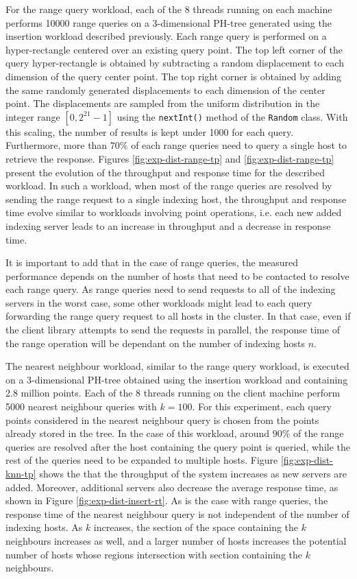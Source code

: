\documentclass[11pt,a4paper]{globis-book}
\begin{document}
For the range query workload, each of the 8 threads running on each machine performs 10000 range queries on a 3-dimensional PH-tree generated using the insertion workload described previously. Each range query is performed on a hyper-rectangle centered over an existing query point. The top left corner of the query hyper-rectangle is obtained by subtracting a random displacement to each dimension of the query center point. The top right corner is obtained by adding the same randomly generated displacements to each dimension of the center point. The displacements are sampled from the uniform distribution in the integer range $[0, 2^{21} - 1]$ using the \texttt{nextInt()} method of the \texttt{Random} class. With this scaling, the number of results is kept under 1000 for each query. Furthermore, more than $70\%$ of each range queries need to query a single host to retrieve the response. Figures \ref{fig:exp-dist-range-tp} and \ref{fig:exp-dist-range-tp} present the evolution of the throughput and response time for the described workload. In such a workload, when most of the range queries are resolved by sending the range request to a single indexing host, the throughput and response time evolve similar to workloads involving point operations, i.e. each new added indexing server leads to an increase in throughput and a decrease in response time.

It is important to add that in the case of range queries, the measured performance depends on the number of hosts that need to be contacted to resolve each range query. As range queries need to send requests to all of the indexing servers in the worst case, some other workloads might lead to each query forwarding the range query request to all hosts in the cluster. In that case, even if the client library attempts to send the requests in parallel, the response time of the range operation will be dependant on the number of indexing hosts $n$. 

The nearest neighbour workload, similar to the range query workload, is executed on a 3-dimensional PH-tree obtained using the insertion workload and containing 2.8 million points. Each of the 8 threads running on the client machine perform 5000 nearest neighbour queries with $k = 100$. For this experiment, each query points considered in the nearest neighbour query is chosen from the points already stored in the tree. In the case of this workload, around $90\%$ of the range queries are resolved after the host containing the query point is queried, while the rest of the queries need to be expanded to multiple hosts. Figure \ref{fig:exp-dist-knn-tp} shows the that the throughput of the system increases as new servers are added. Moreover, additional servers also decrease the average response time, as shown in Figure \ref{fig:exp-dist-insert-rt}. As is the case with range queries, the response time of the nearest neighbour query is not independent of the number of indexing hosts. As $k$ increases, the section of the space containing the $k$ neighbours increases as well, and a larger number of hosts increases the potential number of hosts whose regions intersection with section containing the $k$ neighbours. 
\end{document}
